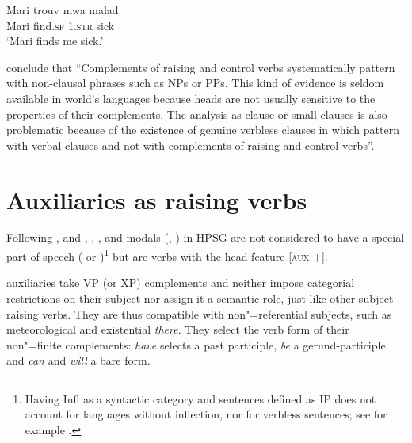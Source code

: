 \ex 
\gll Mari trouv              mwa               malad\\
     Mari find.\textsc{sf}  1\SG.\textsc{str} sick\\
\glt `Mari finds me sick.' \label{ex-anne4}
\zl

\citet[]{HenriandLaurens2011} conclude that ``Complements of raising and control verbs
systematically pattern with non-clausal phrases such as NPs or PPs. This kind of evidence is seldom
available in world's languages because heads are not usually sensitive to the properties of their
complements. The analysis as clause or small clauses is also problematic because of the existence of
genuine verbless clauses in  which pattern with verbal clauses and not with
complements of raising and control verbs''.


\section{Auxiliaries as raising verbs}
\label{sec-auxiliaries-as-raising-verbs}

Following \citet{Ross69a-u}, \citet{Gazdaretal1982} and \citet{Sagetal2020}, , ,  and
modals (\eg {}, ) in HPSG are not considered to have a special part of speech
( or )\footnote{Having Infl as a syntactic category and sentences defined as IP does not account for languages without inflection, nor for verbless sentences; see for example .} but are verbs with the head feature [\textsc{aux} $+$].
 
  auxiliaries take VP (or XP) complements and neither impose categorial restrictions on their subject nor assign it a semantic role,
   just like
 other subject-raising verbs. They are thus compatible with non"=referential subjects, such as
 meteorological  and existential \textit{there}. They select the verb form of their
 non"=finite complements: \textit{have} selects a past participle, \textit{be} a gerund-participle and
 \textit{can} and \textit{will} a bare form.

